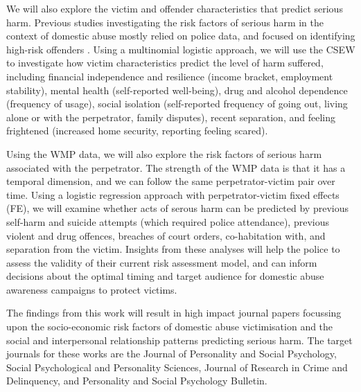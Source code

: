 \documentclass[11pt, a4paper]{article}
\newcommand{\TM}[1] {{\textcolor{orange}{#1}}}
\newcommand{\AT}[1] {{\textcolor{blue}{#1}}}
\begin{document}
 We will also explore the victim and offender characteristics that predict serious harm. Previous studies investigating the risk factors of serious harm in the context of domestic abuse mostly relied on police data, and focused on identifying high-risk offenders \cite{thornton}. Using a multinomial logistic approach, we will use the CSEW to investigate how victim characteristics predict the level of harm suffered, including financial independence and resilience (income bracket, employment stability), mental health (self-reported well-being), drug and alcohol dependence (frequency of usage), social isolation (self-reported frequency of going out, living alone or with the perpetrator, family disputes), recent separation, and feeling frightened (increased home security, reporting feeling scared).
 
 Using the WMP data, we will also explore the risk factors of serious harm associated with the perpetrator. The strength of the WMP data is that it has a temporal dimension, and we can follow the same perpetrator-victim pair over time. Using a logistic regression approach with perpetrator-victim fixed effects (FE), we will examine whether acts of serous harm can be predicted by previous self-harm and suicide attempts (which required police attendance), previous violent and drug offences, breaches of court orders, co-habitation with, and separation from the victim. Insights from these analyses will help the police to assess the validity of their current risk assessment model, and can inform decisions about the optimal timing and target audience for domestic abuse awareness campaigns to protect victims. 
 
 The findings from this work will result in high impact journal papers focussing upon the socio-economic risk factors of domestic abuse victimisation and the social and interpersonal relationship patterns predicting serious harm. The target journals for these works are the Journal of Personality and Social Psychology, Social Psychological and Personality Sciences, Journal of Research in Crime and Delinquency, and Personality and Social Psychology Bulletin.
 
 


%
%
\end{document}
